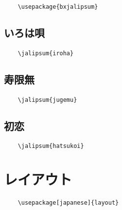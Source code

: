 \documentclass[
    article,
    head_space=25truemm,
    foot_space=10truemm,
    gutter=15truemm]{jlreq}
\begin{document}
\begin{verbatim}
    \usepackage{bxjalipsum}
\end{verbatim}

\subsection{いろは唄}

\begin{verbatim}
    \jalipsum{iroha}
\end{verbatim}

\subsection{寿限無}

\begin{verbatim}
    \jalipsum{jugemu}
\end{verbatim}

\subsection{初恋}

\begin{verbatim}
    \jalipsum{hatsukoi}
\end{verbatim}


\section{レイアウト}

\begin{verbatim}
    \usepackage[japanese]{layout}
\end{verbatim}

\centering
\layout

\printbibliography[title={参考文献}]
\end{document}
